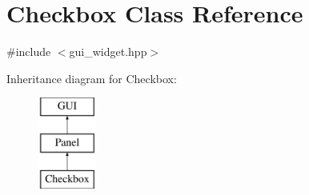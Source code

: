 \hypertarget{class_checkbox}{}\section{Checkbox Class Reference}
\label{class_checkbox}


{\ttfamily \#include $<$gui\+\_\+widget.\+hpp$>$}

Inheritance diagram for Checkbox\+:\begin{figure}[H]
\begin{center}
\leavevmode
\includegraphics[height=3.000000cm]{class_checkbox}
\end{center}
\end{figure}
